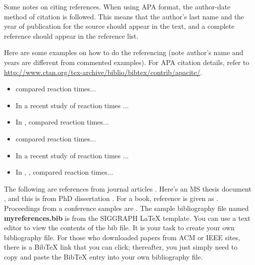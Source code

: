 Some notes on citing references.   
When using APA format, the author-date method of citation is  followed.   
This means that the author's last name and the year of publication for the source should  appear in the text, and a complete reference should appear in the reference list.


Here are some examples on how to do the referencing (note author's name and years are different from commented examples).  
For APA citation details, refer to \url{http://www.ctan.org/tex-archive/biblio/bibtex/contrib/apacite/}. 

\begin{itemize}
 \item {} compared reaction times...
 \item In a recent study of reaction times \cite{kartch:2000:ERA}...
 \item In , \citeauthor{kartch:2000:ERA} compared reaction times...
 \item {} compared reaction times... 
 \item In a recent study of reaction times \cite{fedkiw:2001:VSO}...
 \item In , , compared reaction times...
\end{itemize}

The following are references from journal articles \cite{Park:2006:DSI, Pellacini:2005:LAH, sako:2001:SSB}.
 Here's an MS thesis document \cite{yee:2000:SSA}, and this is from PhD dissertation \cite{kartch:2000:ERA}. 
 For a book, reference is given as  \cite{parke:1996:CFA}. 
 Proceedings from a conference samples are \cite{Jobs95, fedkiw:2001:VSO, levoy:2000:TDM}.  
 The sample bibliography file named \textbf{myreferences.bib} is from the SIGGRAPH \LaTeX{}  template.  
 You can use a text editor to view the contents of the bib file.  
 It is your task to create your own bibliography file.  
 For those who downloaded papers from ACM or IEEE sites, there is a BibTeX link that you can click; thereafter, you just simply need to copy and paste the BibTeX entry into your own bibliography file.

